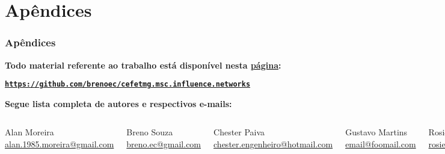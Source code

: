 
\section{Apêndices}

\begin{frame}
  \frametitle{Apêndices}
  \alert{\textbf{Todo material referente ao trabalho está disponível nesta
  \href{https://github.com/brenoec/cefetmg.msc.influence.networks}{página}:}}

  \scriptsize{\textbf{\texttt{\href{https://github.com/brenoec/cefetmg.msc.influence.networks}
  {https://github.com/brenoec/cefetmg.msc.influence.networks}}}}

  \begin{alertblock}{}
    \normalsize{\alert{\textbf{Segue lista completa de autores e respectivos e-mails:}}}
    \vspace{5mm}
    
    \begin{columns}
      \centering
      \normalsize{Alan Moreira}
      \scriptsize{\href{mailto:alan.1985.moreira@gmail.com}{alan.1985.moreira@gmail.com}}
      \vspace{5mm}

      \normalsize{Breno Souza}
      \scriptsize{\href{mailto:breno.ec@gmail.com}{breno.ec@gmail.com}}
      \vspace{5mm}

      \normalsize{Chester Paiva}
      \scriptsize{\href{mailto:chester.engenheiro@hotmail.com}{chester.engenheiro@hotmail.com}}

      \centering
      \normalsize{Gustavo Martins}
      \scriptsize{\href{mailto:email@foomail.com}{email@foomail.com}}
      \vspace{5mm}

      \normalsize{Rosiene Corrêa}
      \scriptsize{\href{mailto:rosienecorrea@yahoo.com.br}{rosienecorrea@yahoo.com.br}}
      \vspace{5mm}

      \normalsize{Vinícius Marinho}
      \scriptsize{\href{mailto:vinicius_marinho@ymail.com}{vinicius\_marinho@ymail.com}}
    \end{columns}
  \end{alertblock}
\end{frame}
